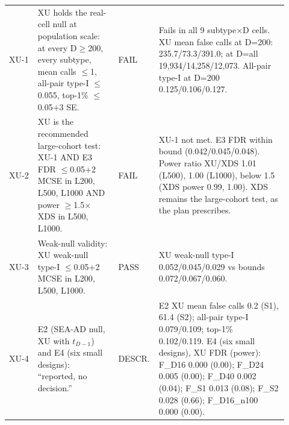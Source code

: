 \begin{table}[p]
\begin{tabular}{@{}>{\raggedright\arraybackslash}p{0.100\linewidth}>{\raggedright\arraybackslash}p{0.285\linewidth}>{\raggedright\arraybackslash}p{0.085\linewidth}>{\raggedright\arraybackslash}p{0.450\linewidth}@{}}
\addlinespace[3pt]
\multicolumn{4}{@{}>{\raggedright\arraybackslash}p{0.90\linewidth}}{\textbf{Plan 1e (XU\_PREREG: XU)}} \\
\cmidrule(lr){1-4}
XU-1 & XU holds the real-cell null at population scale: at every D$\ge$200, every subtype, mean calls $\le$1, all-pair type-I $\le$0.055, top-1\% $\le$0.05+3 SE. & FAIL & Fails in all 9 subtype$\times$D cells. XU mean false calls at D=200: 235.7/73.3/391.0; at D=all 19,934/14,258/12,073. All-pair type-I at D=200 0.125/0.106/0.127. \\
XU-2 & XU is the recommended large-cohort test: XU-1 AND E3 FDR $\le$0.05+2 MCSE in L200, L500, L1000 AND power $\ge$1.5$\times$ XDS in L500, L1000. & FAIL & XU-1 not met. E3 FDR within bound (0.042/0.045/0.048). Power ratio XU/XDS 1.01 (L500), 1.00 (L1000), below 1.5 (XDS power 0.99, 1.00). XDS remains the large-cohort test, as the plan prescribes. \\
XU-3 & Weak-null validity: XU weak-null type-I $\le$0.05+2 MCSE in L200, L500, L1000. & PASS & XU weak-null type-I 0.052/0.045/0.029 vs bounds 0.072/0.067/0.060. \\
XU-4 & E2 (SEA-AD null, XU with $t_{D-1}$) and E4 (six small designs): ``reported, no decision.'' & DESCR. & E2 XU mean false calls 0.2 (S1), 61.4 (S2); all-pair type-I 0.079/0.109; top-1\% 0.102/0.119. E4 (six small designs), XU FDR (power): F\_D16 0.000 (0.00); F\_D24 0.005 (0.00); F\_D40 0.002 (0.04); F\_S1 0.013 (0.08); F\_S2 0.028 (0.66); F\_D16\_n100 0.000 (0.00). \\
\bottomrule
\end{tabular}
\end{table}

